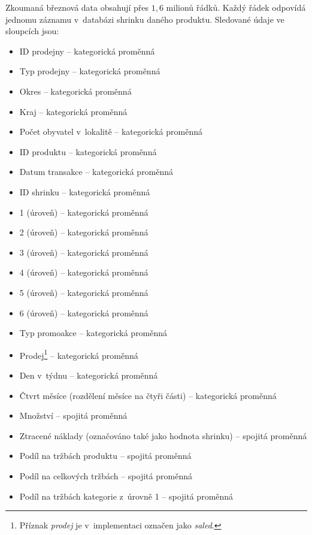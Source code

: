 
Zkoumaná březnová data obsahují přes $1{,6}$ milionů řádků.
Každý řádek odpovídá jednomu záznamu v~databázi shrinku daného produktu. Sledované údaje ve sloupcích jsou: 
\begin{itemize}
    \itemsep-0.34em
    \item ID prodejny -- kategorická proměnná
    \item Typ prodejny -- kategorická proměnná
    \item Okres -- kategorická proměnná
    \item Kraj -- kategorická proměnná
    \item Počet obyvatel v~lokalitě -- kategorická proměnná
    \item ID produktu -- kategorická proměnná
    \item Datum transakce -- kategorická proměnná
    \item ID shrinku -- kategorická proměnná
    \item 1 (úroveň) -- kategorická proměnná
    \item 2 (úroveň) -- kategorická proměnná
    \item 3 (úroveň) -- kategorická proměnná
    \item 4 (úroveň) -- kategorická proměnná
    \item 5 (úroveň) -- kategorická proměnná
    \item 6 (úroveň) -- kategorická proměnná
    \item Typ promoakce -- kategorická proměnná
    \item Prodej\footnote{Příznak \emph{prodej} je v~implementaci označen jako \emph{saled}.} -- kategorická proměnná
    \item Den v~týdnu -- kategorická proměnná
    \item Čtvrt měsíce (rozdělení měsíce na čtyři části) -- kategorická proměnná
    \item Množství -- spojitá proměnná
    \item Ztracené náklady (označováno také jako hodnota shrinku) -- spojitá proměnná
    \item Podíl na tržbách produktu -- spojitá proměnná
    \item Podíl na celkových tržbách -- spojitá proměnná
    \item Podíl na tržbách kategorie z~úrovně 1 -- spojitá proměnná
\end{itemize}
